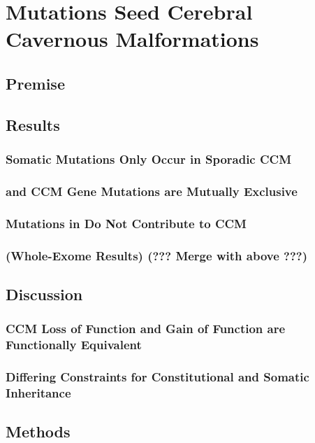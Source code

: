 \chapter{ Mutations Seed Cerebral Cavernous Malformations}

\section{Premise}

\section{Results}
\subsection{ Somatic Mutations Only Occur in Sporadic CCM}
\subsection{ and CCM Gene Mutations are Mutually Exclusive}
\subsection{Mutations in  Do Not Contribute to CCM}
\subsection{(Whole-Exome Results) (??? Merge with above ???)} 

\section{Discussion}
\subsection{CCM Loss of Function and  Gain of Function are Functionally Equivalent}
\subsection{Differing Constraints for Constitutional and Somatic Inheritance}

\section{Methods}